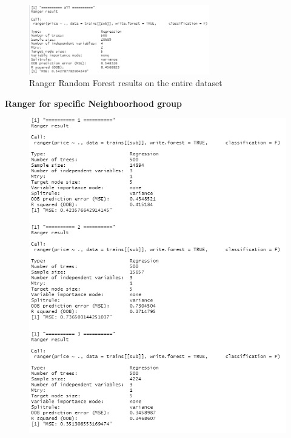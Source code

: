 \documentclass{FR16}
\begin{document}
\begin{figure}[h]
\centering
\includegraphics[width=0.7\textwidth]{figures/rgn.PNG} 
 \caption{\label{fig:16} Ranger Random Forest results on the entire dataset}
\end{figure}
\noindent
\textbf{Ranger for specific Neighboorhood group}\\
\begin{figure}[!htb]
   \begin{minipage}{0.48\textwidth}
     \centering
     \includegraphics[width=1\linewidth]{figures/rgn1.1.png} 
   \end{minipage}\hfill
   \begin{minipage}{0.48\textwidth}
     \centering

\end{minipage}
\end{figure}
\end{document}
